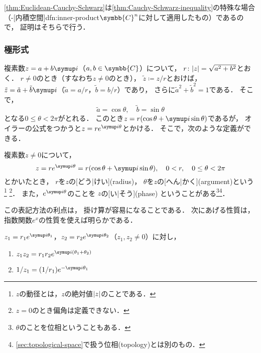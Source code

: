 \documentclass[../sotsu.tex]{subfiles}
\begin{document}
\cref{thm:Euclidean-Cauchy-Schwarz}は\cref{thm:Cauchy-Schwarz-inequality}の特殊な場合%
（-[内積空間]{dfn:inner-product}$\symbb{C}^n$に対して適用したもの）であるので，
証明はそちらで行う．



\subsubsection*{極形式}

複素数$z = a + b \iu$（$a, b \in \symbb{C}$）について，
$r \colon \lvert z\rvert = \sqrt{a^2 + b^2}$とおく．
$r \neq 0$のとき（すなわち$z \neq 0$のとき），
$\tilde{z} \coloneq z / r$とおけば，
$\tilde{z} = \tilde{a} + \tilde{b} \iu$（$\tilde{a} = a / r$，$\tilde{b} = b / r$）であり，
さらに$\tilde{a}^2 + \tilde{b}^2 = 1$である．
そこで，
\begin{equation*}
    \tilde{a} = \cos \theta,
    \quad
    \tilde{b} = \sin \theta
\end{equation*}
となる$0 \leq \theta < 2\pi$がとれる．
このとき$z = r (\cos \theta + \iu \sin \theta)$であるが，
オイラーの公式をつかうと$z = r e^{\iu \theta}$とかける．
そこで，次のような定義ができる．

\begin{definition}
    \label{dfn:complex-plane}
    複素数$z \neq 0$について，
    \begin{equation*}
        z = r e^{\iu \theta}
          = r ( \cos \theta + \iu \sin \theta ),
        \quad 0 < r,
        \quad 0 \leq \theta < 2\pi
    \end{equation*}
    とかいたとき，
    $r$を$z$の[どう|けい](radius)，
    $\theta$を$z$の[へん|かく](argument)という%
    \footnote{$z$の動径とは，$z$の絶対値$\lvert z\rvert$のことである．}%
    \footnote{$z = 0$のとき偏角は定義できない．}．
    また，$e^{\iu \theta}$のことを
    $z$の[い|そう](phase)%
    ということがある\footnote{
        $\theta$のことを位相ということもある．
    }\footnote{
        \cref{sec:topological-space}で扱う位相(topology)とは別のもの．
    }．
\end{definition}

この表記方法の利点は，
掛け算が容易になることである．
次にあげる性質は，
指数関数$e^x$の性質を使えば明らかである．

\begin{proposition}
    \label{thm:product-of-polar-complex-numbers}
    $z_1 = r_1 e^{\iu \theta_1}$，$z_2 = r_2 e^{\iu \theta_2}$（$z_1, z_2 \neq 0$）に対し，
    \begin{enumerate}
        \item $z_1 z_2 = r_1 r_2 e^{\iu (\theta_1 + \theta_2)}$
        \item $1 / z_1 = (1 / r_1) e^{-\iu \theta_1}$
    \end{enumerate}
\end{proposition}
\end{document}
